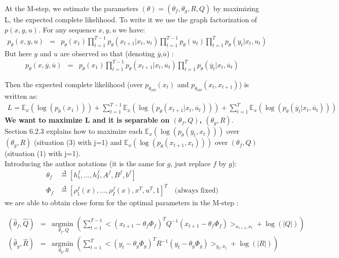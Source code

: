 \documentclass[11pt, oneside]{amsart}
\begin{document}
At the M-step, we estimate the parameters $(\theta)=(\theta_f,\theta_g,R,Q)$ by maximizing L, the expected complete likelihood. To write it we use the graph factorization of $p(x,y,u)$. For any sequence $x,y,u$ we have:
\begin{eqnarray}
p_{\theta}(x,y,u)&=& p_{\theta}(x_1)\prod_{t=1}^{T-1}{p_{\theta}(x_{t+1}|x_t,u_t)}\prod_{t=1}^{T-1}{p_{\theta}(u_t)}\prod_{t=1}^{T}{p_{\theta}(y_t|x_t,u_t)}
\end{eqnarray}
But here $y$ and $u$ are observed so that (denoting $\overline{y}$,$\overline{u}$) :
\begin{eqnarray}
%
p_{\theta}(x,\overline{y},\overline{u})&=& p_{\theta}(x_1)\prod_{t=1}^{T-1}{p_{\theta}(x_{t+1}|x_t,\overline{u}_t)}\prod_{t=1}^{T}{p_{\theta}(\overline{y}_t|x_t,\overline{u}_t)}
\end{eqnarray}

Then the expected complete likelihood (over $p_{\theta_{old}}(x_t)$ and $p_{\theta_{old}}(x_t,x_{t+1})$) is written as:
\begin{eqnarray}
L=\mathbb{E}_x(\log(p_{\theta}(x_1)))+\sum_{t=1}^{T-1}{\mathbb{E}_x(\log(p_{\theta}(x_{t+1}|x_t,\overline{u}_t)))}+\sum_{t=1}^{T}{\mathbb{E}_x(\log(p_{\theta}(\overline{y}_t|x_t,\overline{u}_t)))}\nonumber
\end{eqnarray}
\textbf{We want to maximize L and it is separable on $(\theta_f,Q)$, $(\theta_g,R)$}.\\

Section 6.2.3 explains how to maximize each $\mathbb{E}_x(\log(p_{\theta}(\overline{y}_t,x_t)))$ over $(\theta_g,R)$ (situation (3) with j=1) and $\mathbb{E}_x(\log(p_{\theta}(x_{t+1},x_t)))$ over $(\theta_f,Q)$ (situation (1) with j=1).\\
Introducing the author notations (it is the same for $g$, just replace $f$ by $g$): 
\begin{align*}
\theta_f & \overset{\Delta}{=} [h_1^f, \ldots, h_I^f, A^f, B^f, b^f] \\
\Phi_f & \overset{\Delta}{=} [\rho_1^f(x),\ldots, \rho_I^f(x), x^T, u^T, 1]^T \quad\text{(always fixed)} 
\end{align*}
we are able to obtain close form for the optimal parameters in the M-step :

\begin{eqnarray}
(\hat{\theta}_f,\hat{Q})&=&\underset{\theta_f,Q}{\text{argmin }}{\left(\sum_{t=1}^{T-1}{
<(x_{t+1}-\theta_f\Phi_f)^T Q^{-1}(x_{t+1}-\theta_f\Phi_f) >_{x_{t+1},x_t}+\log(|Q|)
}\right)}\nonumber\\
(\hat{\theta}_g,\hat{R})&=&\underset{\theta_g,R}{\text{argmin }}{\left(\sum_{t=1}^{T}{
<(y_{t}-\theta_g\Phi_g)^T R^{-1}(y_{t}-\theta_g\Phi_g) >_{y_t,x_t}+\log(|R|)
}\right)}\nonumber\\
\end{eqnarray}
\end{document}

